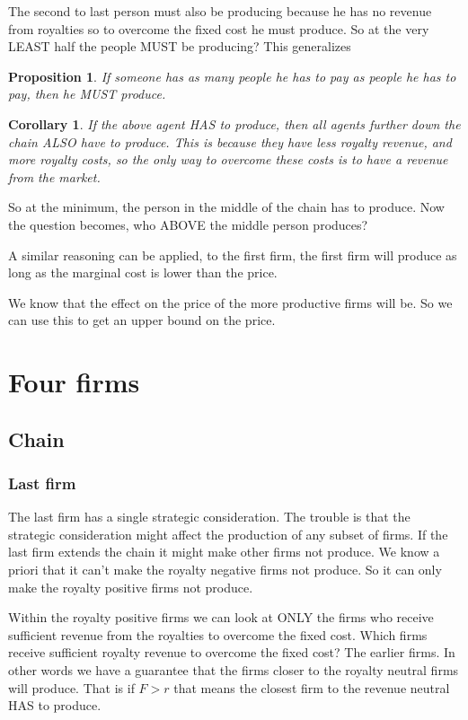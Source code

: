 \documentclass{article}
\newtheorem{corollary}{Corollary}
\newtheorem{proposition}{Proposition}
\begin{document}
The second to last person must also be producing because he has no revenue from royalties so to overcome the fixed cost he must produce. So at the very LEAST half the people MUST be producing? This generalizes

\begin{proposition}
If someone has as many people he has to pay as people he has to pay, then he MUST produce. 
\end{proposition}

\begin{corollary}
If the above agent HAS to produce, then all agents further down the chain ALSO have to produce. This is because they have less royalty revenue, and more royalty costs, so the only way to overcome these costs is to have a revenue from the market. 
\end{corollary}

So at the minimum, the person in the middle of the chain has to produce. Now the question becomes, who ABOVE the middle person produces? 

A similar reasoning can be applied, to the first firm, the first firm will produce as long as the marginal cost is lower than the price. 

We know that the effect on the price of the more productive firms will be. So we can use this to get an upper bound on the price.  

\section{Four firms}

\subsection{Chain}

\subsubsection{Last firm}

The last firm has a single strategic consideration. The trouble is that the strategic consideration might affect the production of any subset of firms. If the last firm extends the chain it might make other firms not produce. We know a priori that it can't make the royalty negative firms not produce. So it can only make the royalty positive firms not produce.

Within the royalty positive firms we can look at ONLY the firms who receive sufficient revenue from the royalties to overcome the fixed cost. Which firms receive sufficient royalty revenue to overcome the fixed cost? The earlier firms. In other words we have a guarantee that the firms closer to the royalty neutral firms will produce. That is if $F>r$ that means the closest firm to the revenue neutral HAS to produce. 
\end{document}
